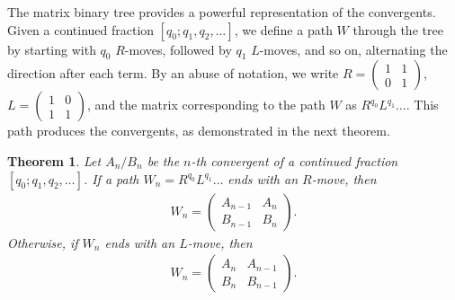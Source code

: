 \documentclass[12pt]{article}
\theoremstyle{plain}
\newtheorem{theorem}{Theorem}
\theoremstyle{definition}
\theoremstyle{remark}
\begin{document}
The matrix binary tree provides a powerful representation of the convergents. Given a continued fraction $ [q_0; q_1, q_2, \ldots] $, we define a path $ W $ through the tree by starting with $ q_0 $ $ R $-moves, followed by $ q_1 $ $ L $-moves, and so on, alternating the direction after each term. By an abuse of notation, we write $ R = \begin{pmatrix} 1 & 1 \\ 0 & 1 \end{pmatrix} $, $ L = \begin{pmatrix} 1 & 0 \\ 1 & 1 \end{pmatrix} $, and the matrix corresponding to the path $ W $ as $ R^{q_0} L^{q_1} \ldots $. This path produces the convergents, as demonstrated in the next theorem.
\begin{theorem} \label{Th: Convergent Matrix} 
Let $ A_n/B_n $ be the $ n $-th convergent of a continued fraction $ [q_0; q_1, q_2, \ldots] $. If a path $ W_n = R^{q_0} L^{q_1} \ldots $ ends with an $ R $-move, then 
\begin{align*}
	W_n = \begin{pmatrix} A_{n - 1} & A_n \\ B_{n - 1} & B_n \end{pmatrix}.
\end{align*}
Otherwise, if $ W_n $ ends with an $ L $-move, then 
\begin{align*}
	W_n = \begin{pmatrix} A_n & A_{n - 1} \\ B_n & B_{n - 1} \end{pmatrix}.
\end{align*}
\end{theorem}
\end{document}
